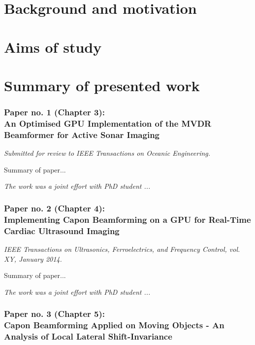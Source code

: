 \section{Background and motivation}

\section{Aims of study}

\section{Summary of presented work}

\subsubsection{Paper no. 1 (Chapter 3):\\
An Optimised GPU Implementation of the MVDR Beamformer for Active Sonar Imaging}

{\it Submitted for review to IEEE Transactions on Oceanic Engineering.}
\vspace{0.3 cm}

Summary of paper...

\vspace{0.3 cm}
\emph{The work was a joint effort with PhD student ...}


\subsubsection{Paper no. 2 (Chapter 4):\\
Implementing Capon Beamforming on a GPU for Real-Time Cardiac Ultrasound Imaging}

{\it IEEE Transactions on Ultrasonics, Ferroelectrics, and Frequency Control, vol. XY, January 2014.}
\vspace{0.3 cm}

Summary of paper...
 
\vspace{0.3 cm}
\emph{The work was a joint effort with PhD student ...}

\subsubsection{Paper no. 3 (Chapter 5):\\
Capon Beamforming Applied on Moving Objects - An Analysis of Local Lateral Shift-Invariance}

